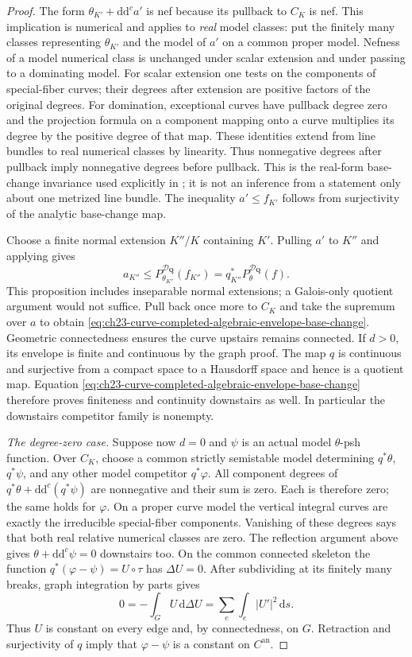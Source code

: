 \begin{proof}
The form $\theta_{K'}+\mathrm d\mathrm d^ca'$ is nef because its
pullback to $C_K$ is nef.  This implication is numerical and applies to
\emph{real} model classes: put the finitely many classes representing
$\theta_{K'}$ and the model of $a'$ on a common proper model.
Nefness of a model numerical class is unchanged under scalar extension
and under passing to a dominating model.  For scalar extension one tests
on the components of special-fiber curves; their degrees after extension
are positive factors of the original degrees.  For domination,
exceptional curves have pullback degree zero and the projection formula
on a component mapping onto a curve multiplies its degree by the
positive degree of that map.  These identities extend from line bundles
to real numerical classes by linearity.  Thus nonnegative degrees after
pullback imply nonnegative degrees before pullback.  This is the real-form
base-change invariance used explicitly in
\cite[proof of Proposition~3.7]{GJKM19}; it is not an inference from a
statement only about one metrized line bundle.  The inequality
$a'\leq f_{K'}$ follows from surjectivity of the analytic base-change
map.

Choose a finite normal extension $K''/K$ containing $K'$.  Pulling $a'$
to $K''$ and applying \cite[Proposition~2.11]{GJKM19} gives
\[
 a_{K''}\leq P^{\mathcal D_{\mathbf Q}}_{\theta_{K''}}(f_{K''})
           =q_{K''}^*P^{\mathcal D_{\mathbf Q}}_\theta(f).
\]
This proposition includes inseparable normal extensions; a Galois-only
quotient argument would not suffice.  Pull back once more to $C_K$ and
take the supremum over $a$ to obtain
\eqref{eq:ch23-curve-completed-algebraic-envelope-base-change}.
Geometric connectedness ensures the curve upstairs remains connected.
If $d>0$, its envelope is finite and continuous by the graph proof.
The map $q$ is continuous and surjective from a compact space to a
Hausdorff space and hence is a quotient map.  Equation
\eqref{eq:ch23-curve-completed-algebraic-envelope-base-change} therefore
proves finiteness and continuity downstairs as well.  In particular the
downstairs competitor family is nonempty.

\emph{The degree-zero case.}
Suppose now $d=0$ and $\psi$ is an actual model $\theta$-psh function.
Over $C_K$, choose a common strictly semistable model determining
$q^*\theta$, $q^*\psi$, and any other model competitor $q^*\varphi$.
All component degrees of
$q^*\theta+\mathrm d\mathrm d^c(q^*\psi)$ are nonnegative and their
sum is zero.  Each is therefore zero; the same holds for $\varphi$.
On a proper curve model the vertical integral curves are exactly the
irreducible special-fiber components.  Vanishing of these degrees says
that both real relative numerical classes are zero.
The reflection argument above gives
$\theta+\mathrm d\mathrm d^c\psi=0$ downstairs too.
On the common connected skeleton the function
$q^*(\varphi-\psi)=U\circ\tau$ has $\Delta U=0$.
After subdividing at its finitely many breaks, graph integration by parts
gives
\[
 0=-\int_G U\,\mathrm d\Delta U
   =\sum_e\int_e|U'|^2\,\mathrm ds.
\]
Thus $U$ is constant on every edge and, by connectedness, on $G$.
Retraction and surjectivity of $q$ imply that $\varphi-\psi$ is a
constant on $C^{\mathrm{an}}$.


\end{proof}
